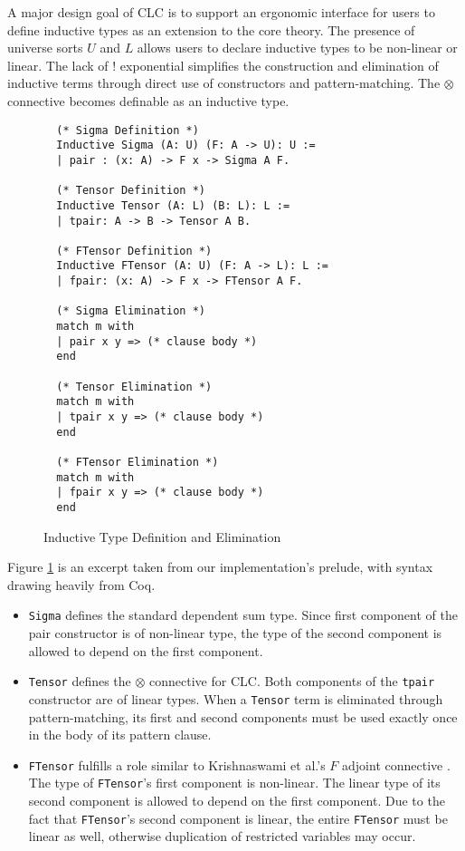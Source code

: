 \documentclass[sigplan,screen,review,authordraft]{acmart}
\theoremstyle{definition}
\begin{document}
  A major design goal of CLC is to support an ergonomic interface for users to define inductive types \cite{inductive,cic} as an extension to the core theory. The presence of universe sorts $U$ and $L$ allows users to declare inductive types to be non-linear or linear. The lack of ! exponential simplifies the construction and elimination of inductive terms through direct use of constructors and pattern-matching. The $\otimes$ connective becomes definable as an inductive type.

  \begin{figure}[h]
  \vspace{-1em}
  \caption{Inductive Type Definition and Elimination}
  \begin{lstlisting}
  (* Sigma Definition *)
  Inductive Sigma (A: U) (F: A -> U): U :=
  | pair : (x: A) -> F x -> Sigma A F.

  (* Tensor Definition *)
  Inductive Tensor (A: L) (B: L): L :=
  | tpair: A -> B -> Tensor A B.

  (* FTensor Definition *)
  Inductive FTensor (A: U) (F: A -> L): L :=
  | fpair: (x: A) -> F x -> FTensor A F.

  (* Sigma Elimination *)
  match m with
  | pair x y => (* clause body *)
  end

  (* Tensor Elimination *)
  match m with
  | tpair x y => (* clause body *)
  end

  (* FTensor Elimination *)
  match m with
  | fpair x y => (* clause body *)
  end
  \end{lstlisting}
  \vspace{-1em}
  \label{inductive}
  \Description{}
  \end{figure}
  
  Figure \ref{inductive} is an excerpt taken from our implementation's prelude, with syntax drawing heavily from Coq.

  \begin{itemize}
    \item \texttt{Sigma} defines the standard dependent sum type. Since first component of the pair constructor is of non-linear type, the type of the second component is allowed to depend on the first component.
    \item \texttt{Tensor} defines the $\otimes$ connective for CLC. Both components of the \texttt{tpair} constructor are of linear types. When a \texttt{Tensor} term is eliminated through pattern-matching, its first and second components must be used exactly once in the body of its pattern clause.
    \item \texttt{FTensor} fulfills a role similar to Krishnaswami et al.'s $F$ adjoint connective \cite{neel15}. The type of \texttt{FTensor}'s first component is non-linear. The linear type of its second component is allowed to depend on the first component. Due to the fact that \texttt{FTensor}'s second component is linear, the entire \texttt{FTensor} must be linear as well, otherwise duplication of restricted variables may occur.
  \end{itemize}
  
\end{document}
